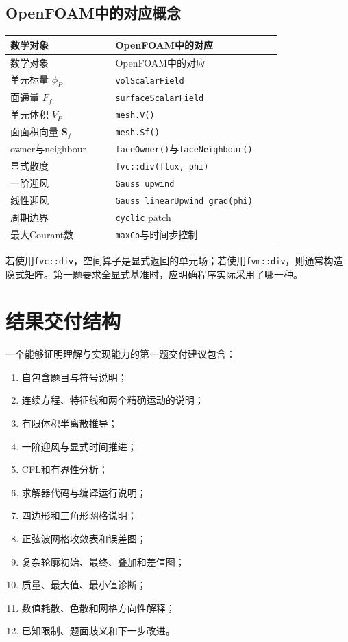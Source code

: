 \documentclass[UTF8,12pt,a4paper,fontset=fandol]{ctexart}
\numberwithin{equation}{section}
\newcommand{\Sf}{\bm S}
\begin{document}
\subsection{OpenFOAM中的对应概念}

\begin{longtable}{L{0.34\linewidth}L{0.54\linewidth}}
\toprule
数学对象 & OpenFOAM中的对应\\
\midrule
\endfirsthead
\toprule
数学对象 & OpenFOAM中的对应\\
\midrule
\endhead
单元标量 $\phi_P$ & \texttt{volScalarField}\\
面通量 $F_f$ & \texttt{surfaceScalarField}\\
单元体积 $V_P$ & \texttt{mesh.V()}\\
面面积向量 $\Sf_f$ & \texttt{mesh.Sf()}\\
owner与neighbour & \texttt{faceOwner()}与\texttt{faceNeighbour()}\\
显式散度 & \texttt{fvc::div(flux, phi)}\\
一阶迎风 & \texttt{Gauss upwind}\\
线性迎风 & \texttt{Gauss linearUpwind grad(phi)}\\
周期边界 & \texttt{cyclic} patch\\
最大Courant数 & \texttt{maxCo}与时间步控制\\
\bottomrule
\end{longtable}

若使用\texttt{fvc::div}，空间算子是显式返回的单元场；若使用\texttt{fvm::div}，则通常构造隐式矩阵。第一题要求全显式基准时，应明确程序实际采用了哪一种。

\section{结果交付结构}

一个能够证明理解与实现能力的第一题交付建议包含：

\begin{enumerate}
  \item 自包含题目与符号说明；
  \item 连续方程、特征线和两个精确运动的说明；
  \item 有限体积半离散推导；
  \item 一阶迎风与显式时间推进；
  \item CFL和有界性分析；
  \item 求解器代码与编译运行说明；
  \item 四边形和三角形网格说明；
  \item 正弦波网格收敛表和误差图；
  \item 复杂轮廓初始、最终、叠加和差值图；
  \item 质量、最大值、最小值诊断；
  \item 数值耗散、色散和网格方向性解释；
  \item 已知限制、题面歧义和下一步改进。
\end{enumerate}
\end{document}
